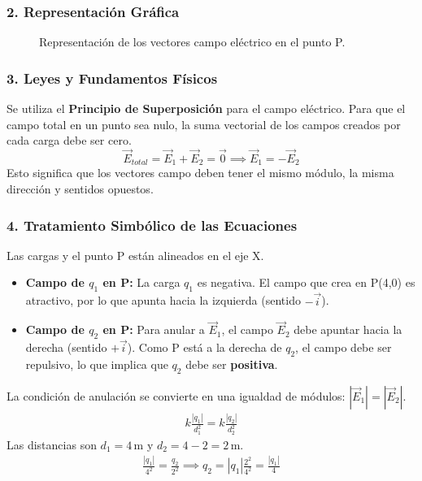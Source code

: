 \subsubsection*{2. Representación Gráfica}
\begin{figure}[H]
    \centering
    \caption{Representación de los vectores campo eléctrico en el punto P.}
\end{figure}
\subsubsection*{3. Leyes y Fundamentos Físicos}
Se utiliza el \textbf{Principio de Superposición} para el campo eléctrico. Para que el campo total en un punto sea nulo, la suma vectorial de los campos creados por cada carga debe ser cero.
$$ \vec{E}_{total} = \vec{E}_1 + \vec{E}_2 = \vec{0} \implies \vec{E}_1 = -\vec{E}_2 $$
Esto significa que los vectores campo deben tener el mismo módulo, la misma dirección y sentidos opuestos.
\subsubsection*{4. Tratamiento Simbólico de las Ecuaciones}
Las cargas y el punto P están alineados en el eje X.
\begin{itemize}
    \item \textbf{Campo de $q_1$ en P:} La carga $q_1$ es negativa. El campo que crea en P(4,0) es atractivo, por lo que apunta hacia la izquierda (sentido $-\vec{i}$).
    \item \textbf{Campo de $q_2$ en P:} Para anular a $\vec{E}_1$, el campo $\vec{E}_2$ debe apuntar hacia la derecha (sentido $+\vec{i}$). Como P está a la derecha de $q_2$, el campo debe ser repulsivo, lo que implica que $q_2$ debe ser \textbf{positiva}.
\end{itemize}
La condición de anulación se convierte en una igualdad de módulos: $|\vec{E}_1| = |\vec{E}_2|$.
\begin{gather}
    k\frac{|q_1|}{d_1^2} = k\frac{|q_2|}{d_2^2}
\end{gather}
Las distancias son $d_1 = 4\,\text{m}$ y $d_2 = 4-2=2\,\text{m}$.
\begin{gather}
    \frac{|q_1|}{4^2} = \frac{q_2}{2^2} \implies q_2 = |q_1|\frac{2^2}{4^2} = \frac{|q_1|}{4}
\end{gather}
